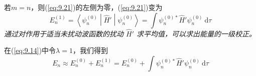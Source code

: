     若$m=n$，则(\ref{eq:9.21})的左侧为零，(\ref{eq:9.21})变为
    \begin{equation}
        \boxed{
            E_n^{\left(1\right)} = \left\langle \psi_n^{\left(0\right)} \middle| \hat{H}' \middle| \psi_n^{\left(0\right)} \right\rangle = \int \psi_n^{\left(0\right)\ast} \hat{H}' \psi_n^{\left(0\right)} \:\mathrm{d}\tau
        }
        \label{eq:9.22}
    \end{equation}
    \textit{通过对作用于适当未扰动波函数的扰动 $\hat{H}'$ 求平均值，可以求出能量的一级校正。}

    在(\ref{eq:9.14})中令$\lambda=1$，我们得到
    \begin{equation}
        E_n \approx E_n^{\left(0\right)} + E_n^{\left(1\right)} = E_n^{\left(0\right)} + \int \psi_n^{\left(0\right)\ast} \hat{H}' \psi_n^{\left(0\right)} \:\mathrm{d}\tau
        \label{eq:9.23}
    \end{equation}

